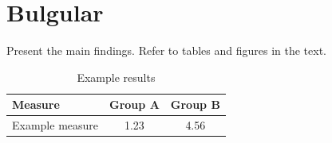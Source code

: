 \documentclass[12pt]{article}
\begin{document}
%
%
%
%
%
%
%
%


\section{Bulgular}
Present the main findings. Refer to tables and figures in the text.

\begin{table}[htbp]
    \centering
    \caption{Example results}
    \label{tab:results}
    \begin{tabular}{lcc}
        \toprule
        Measure & Group A & Group B \\
        \midrule
        Example measure & 1.23 & 4.56 \\
        \bottomrule
    \end{tabular}
\end{table}
\end{document}
